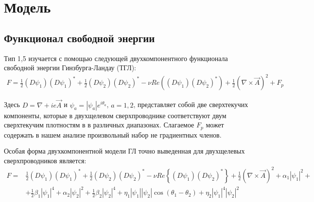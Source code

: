 \chapter{Модель}
\label{ch:2}

\section{Функционал свободной энергии}
\label{sec:2-1}

Тип 1,5 изучается с помощью следующей двухкомпонентного функционала свободной 
энергии Гинзбурга-Ландау (ТГЛ):
\begin{align}
	F = \frac{1}{2}(D\psi_1)(D\psi_1)^* + \frac{1}{2}(D\psi_2)(D\psi_2)^* - 
		\nu Re\left( (D\psi_1)(D\psi_2)^* \right) + 
		\frac{1}{2}\left(\nabla\times\vec{A}\right)^2 + F_p
	\label{eq:1}
\end{align}

Здесь \( D = \nabla + ie\vec{A} \) и \( \psi_a = |\psi_a|e^{i\theta_a} \), 
\( a = 1,2 \), представляет собой две сверхтекучих компоненты, которые в 
двухщелевом сверхпроводнике соответствуют двум сверхтекучим плотностям в 
в различных диапазонах. Слагаемое \( F_p \) может содержать в нашем 
анализе произвольный набор не градиентных членов.

Особая форма двухкомпонентной модели ГЛ точно выведенная 
\cite{bib:8,bib:9,bib:10} для двухщелевых сверхпроводников является:
\begin{align}
	F = & \frac{1}{2}(D\psi_1)(D\psi_1)^* + \frac{1}{2}(D\psi_2)(D\psi_2)^* - 
		\nu Re\left\{ (D\psi_1)(D\psi_2)^* \right\} + 
		\frac{1}{2}\left(\nabla\times\vec{A}\right)^2 + \alpha_1|\psi_1|^2 + 
		\nonumber \\
		& + \frac{1}{2}\beta_1|\psi_1|^4 + \alpha_2|\psi_2|^2 + 
		\frac{1}{2}\beta_2|\psi_2|^4 + \eta_1|\psi_1||\psi_2|
		\cos(\theta_1-\theta_2) + \eta_2|\psi_1|^4|\psi_2|^2
	\label{eq:2}
\end{align}

